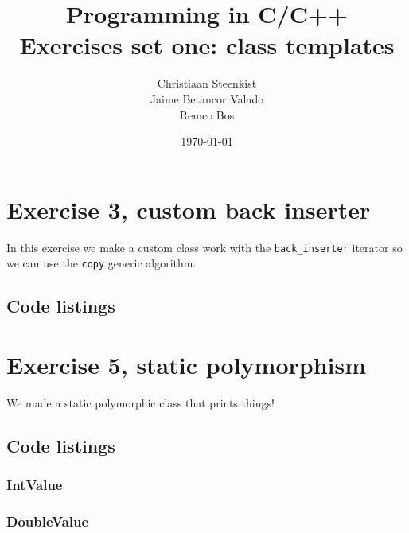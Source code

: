 \documentclass[11pt]{article}
\begin{document}
\title{Programming in C/C++ \\
       Exercises set one: class templates
}
\date{\today}
\author{Christiaan Steenkist \\
Jaime Betancor Valado \\
Remco Bos \\
}

\maketitle
\section*{Exercise 3, custom back inserter}
In this exercise we make a custom class work with the \texttt{back\_inserter} iterator so we can use the \texttt{copy} generic algorithm.

\subsection*{Code listings}





\section*{Exercise 5, static polymorphism}
We made a static polymorphic class that prints things!

\subsection*{Code listings}






\subsubsection*{IntValue}



\subsubsection*{DoubleValue}


\end{document}
